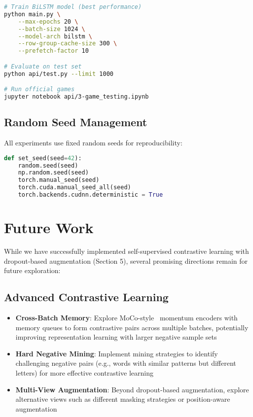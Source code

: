 \documentclass[12pt,a4paper]{article}
\begin{document}
\begin{lstlisting}[language=bash, caption={Training Command}]
# Train BiLSTM model (best performance)
python main.py \
    --max-epochs 20 \
    --batch-size 1024 \
    --model-arch bilstm \
    --row-group-cache-size 300 \
    --prefetch-factor 10

# Evaluate on test set
python api/test.py --limit 1000

# Run official games
jupyter notebook api/3-game_testing.ipynb
\end{lstlisting}

\subsection{Random Seed Management}

All experiments use fixed random seeds for reproducibility:
\begin{lstlisting}[language=Python]
def set_seed(seed=42):
    random.seed(seed)
    np.random.seed(seed)
    torch.manual_seed(seed)
    torch.cuda.manual_seed_all(seed)
    torch.backends.cudnn.deterministic = True
\end{lstlisting}

\section{Future Work}

While we have successfully implemented self-supervised contrastive learning with dropout-based augmentation (Section 5), several promising directions remain for future exploration:

\subsection{Advanced Contrastive Learning}

\begin{itemize}
    \item \textbf{Cross-Batch Memory}: Explore MoCo-style~\cite{chen2020simclr} momentum encoders with memory queues to form contrastive pairs across multiple batches, potentially improving representation learning with larger negative sample sets
    \item \textbf{Hard Negative Mining}: Implement mining strategies to identify challenging negative pairs (e.g., words with similar patterns but different letters) for more effective contrastive learning
    \item \textbf{Multi-View Augmentation}: Beyond dropout-based augmentation, explore alternative views such as different masking strategies or position-aware augmentation
\end{itemize}
\end{document}
